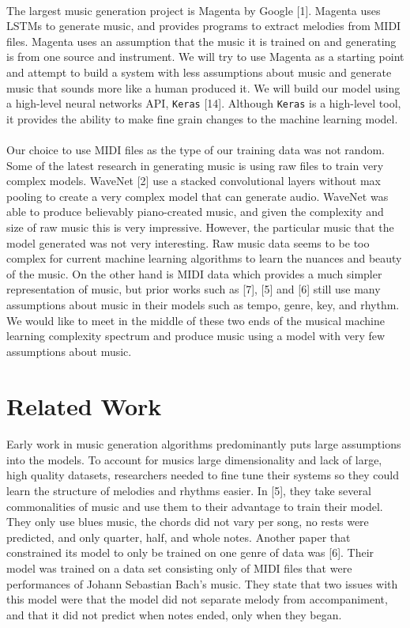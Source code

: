 \documentclass[final]{article}
\begin{document}
\paragraph{}The largest music generation project is Magenta by Google [1].  Magenta uses LSTMs to generate music, and provides programs to extract melodies from MIDI files.  Magenta uses an assumption that the music it is trained on and generating is from one source and instrument. We will try to use Magenta as a starting point and attempt to build a system with less assumptions about music and generate music that sounds more like a human produced it.  We will build our model using a high-level neural networks API, \texttt{Keras} [14].  Although \texttt{Keras} is a high-level tool, it provides the ability to make fine grain changes to the machine learning model.
\paragraph{}Our choice to use MIDI files as the type of our training data was not random.  Some of the latest research in generating music is using raw files to train very complex models.  WaveNet [2] use a stacked convolutional layers without max pooling to create a very complex model that can generate audio.  WaveNet was able to produce believably piano-created music, and given the complexity and size of raw music this is very impressive.  However, the particular music that the model generated was not very interesting.  Raw music data seems to be too complex for current machine learning algorithms to learn the nuances and beauty of the music.  On the other hand is MIDI data which provides a much simpler representation of music, but prior works such as [7], [5] and [6] still use many assumptions about music in their models such as tempo, genre, key, and rhythm.  We would like to meet in the middle of these two ends of the musical machine learning complexity spectrum and produce music using a model with very few assumptions about music.

\section{Related Work}
\paragraph{}Early work in music generation algorithms predominantly puts large assumptions into the models.  To account for musics large dimensionality and lack of large, high quality datasets, researchers needed to fine tune their systems so they could learn the structure of melodies and rhythms easier.  In [5], they take several commonalities of music and use them to their advantage to train their model.  They only use blues music, the chords did not vary per song, no rests were predicted, and only quarter, half, and whole notes. Another paper that constrained its model to only be trained on one genre of data was [6].  Their model was trained on a data set consisting only of MIDI files that were performances of Johann Sebastian Bach\rq s music.  They state that two issues with this model were that the model did not separate melody from accompaniment, and that it did not predict when notes ended, only when they began.
\end{document}
